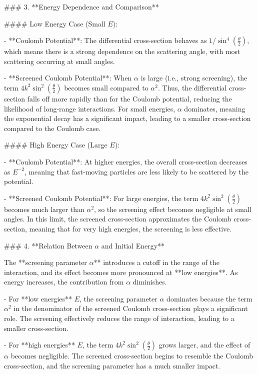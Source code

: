 ### 3. **Energy Dependence and Comparison**

#### Low Energy Case (Small \( E \)):

- **Coulomb Potential**: The differential cross-section behaves as \( 1 / \sin^4\left(\frac{\theta}{2}\right) \), which means there is a strong dependence on the scattering angle, with most scattering occurring at small angles.
  
- **Screened Coulomb Potential**: When \( \alpha \) is large (i.e., strong screening), the term \( 4k^2 \sin^2\left( \frac{\theta}{2} \right) \) becomes small compared to \( \alpha^2 \). Thus, the differential cross-section falls off more rapidly than for the Coulomb potential, reducing the likelihood of long-range interactions. For small energies, \( \alpha \) dominates, meaning the exponential decay has a significant impact, leading to a smaller cross-section compared to the Coulomb case.

#### High Energy Case (Large \( E \)):

- **Coulomb Potential**: At higher energies, the overall cross-section decreases as \( E^{-2} \), meaning that fast-moving particles are less likely to be scattered by the potential.
  
- **Screened Coulomb Potential**: For large energies, the term \( 4k^2 \sin^2\left( \frac{\theta}{2} \right) \) becomes much larger than \( \alpha^2 \), so the screening effect becomes negligible at small angles. In this limit, the screened cross-section approximates the Coulomb cross-section, meaning that for very high energies, the screening is less effective.

### 4. **Relation Between \( \alpha \) and Initial Energy**

The **screening parameter \( \alpha \)** introduces a cutoff in the range of the interaction, and its effect becomes more pronounced at **low energies**. As energy increases, the contribution from \( \alpha \) diminishes.

- For **low energies** \( E \), the screening parameter \( \alpha \) dominates because the term \( \alpha^2 \) in the denominator of the screened Coulomb cross-section plays a significant role. The screening effectively reduces the range of interaction, leading to a smaller cross-section.
  
- For **high energies** \( E \), the term \( 4k^2 \sin^2\left( \frac{\theta}{2} \right) \) grows larger, and the effect of \( \alpha \) becomes negligible. The screened cross-section begins to resemble the Coulomb cross-section, and the screening parameter has a much smaller impact.

